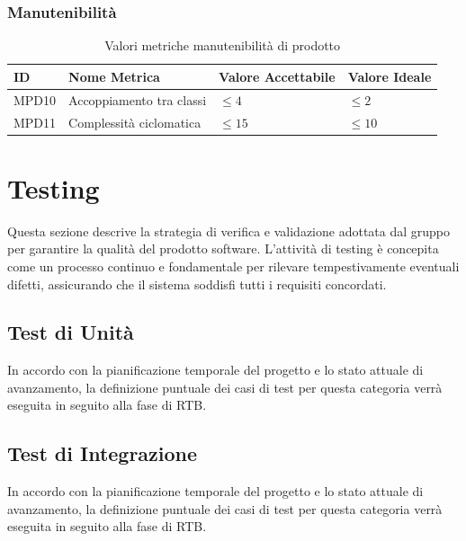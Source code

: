 \documentclass[a4paper,12pt]{article}
\begin{document}
            \subsubsection{Manutenibilità}
            \begin{longtable}{|M{1.5cm}|M{5cm}|M{2.5cm}|M{2.5cm}|}

                \caption{Valori metriche manutenibilità di prodotto} \\
                \hline
                \textbf{ID} & \textbf{Nome Metrica} & \textbf{Valore Accettabile} & \textbf{Valore Ideale} \\
                \hline
                \endhead

                    MPD10 & Accoppiamento tra classi & $\le4$ & $\le2$ \\
                    \hline

                    MPD11 & Complessità ciclomatica & $\le15$ & $\le10$ \\
                    \hline

            \end{longtable}
            
\newpage
    \section{Testing}

    Questa sezione descrive la strategia di verifica e validazione adottata dal gruppo per garantire la qualità del prodotto software.
    L'attività di testing è concepita come un processo continuo e fondamentale per rilevare tempestivamente eventuali difetti, assicurando che il sistema soddisfi tutti i requisiti concordati.

        \subsection{Test di Unità}

        In accordo con la pianificazione temporale del progetto e lo stato attuale di avanzamento, la definizione puntuale dei casi di test per questa categoria verrà eseguita in seguito alla fase di RTB.

        \subsection{Test di Integrazione}

        In accordo con la pianificazione temporale del progetto e lo stato attuale di avanzamento, la definizione puntuale dei casi di test per questa categoria verrà eseguita in seguito alla fase di RTB.
\end{document}
